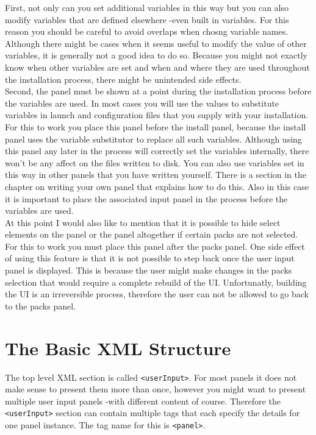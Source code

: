 First, not only can you set additional variables in this way but you can
also modify variables that are defined elsewhere -even built in
variables. For this reason you should be careful to avoid overlaps when
chosng variable names. Although there might be cases when it seems
useful to modify the value of other variables, it is generally not a
good idea to do so. Because you might not exactly know when other
variables are set and when and where they are used throughout the
installation process, there might be unintended side effects.\\

Second, the panel must be shown at a point during the installation
process before the variables are used. In most cases you will use the
values to substitute variables in launch and configuration files that
you supply with your installation. For this to work you place this panel
before the install panel, because the install panel uses the variable
substitutor to replace all such variables. Although using this panel any
later in the process will correctly set the variables internally, there
won't be any affect on the files written to disk. You can also use
variables set in this way in other panels that you have written
yourself. There is a section in the  chapter on writing your own panel
that explains how to do this. Also in this case it is important to place
the associated input panel in the process before the variables are
used.\\

At this point I would also like to mention that it is possible to hide
select elements on the panel or the panel altogether if certain packs
are not selected. For this to work you must place this panel after the
packs panel. One side effect of using this feature is that it is not
possible to step back once the user input panel is displayed. This is
because the user might make changes in the packs selection that would
require a complete rebuild of the UI. Unfortunatly, building the UI is
an irreversible process, therefore the user can not be allowed to go
back to the packs panel.\\


\section{The Basic XML Structure}

The top level XML section is called \texttt{<userInput>}. For most
panels it does not make sense to present them more than once, however
you might want to present multiple user input panels -with different
content of course. Therefore the \texttt{<userInput>} section can
contain multiple tags that each specify the details for one panel
instance. The tag name for this is \texttt{<panel>}.\\

